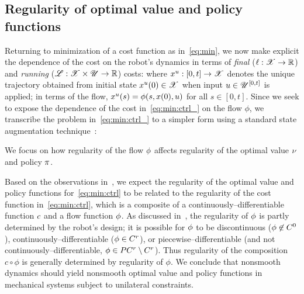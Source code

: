 \documentclass{article}
\begin{document}
\subsection{Regularity of optimal value and policy functions}
\label{sec:reg:opt}
Returning to minimization of a cost function as in~\eqref{eq:min}, 
we now make explicit the dependence of the cost
on the robot's dynamics in terms of 
\emph{final} 
($\ell:\mathscr{X}\rightarrow\mathbb{R}$)
and 
\emph{running}
($\mathscr{L}:\mathscr{X}\times\mathscr{U}\rightarrow\mathbb{R}$)
costs:
where $x^u:[0,t]\rightarrow\mathscr{X}$ denotes the unique trajectory obtained from initial state $x^u(0)\in\mathscr{X}$ when input $u\in\mathscr{U}^{[0,t]}$ is applied; in terms of the flow, $x^u(s) = \phi(s,x(0),u)$ for all $s\in[0,t]$.
Since we seek to expose the dependence of the cost in~\eqref{eq:min:ctrl_} on the flow $\phi$, we transcribe the problem in~\eqref{eq:min:ctrl_} to a simpler form using a standard state augmentation technique~:
 
We focus on how regularity of the flow 
$\phi$ 
affects regularity of the optimal value $\nu$ and policy $\pi$.

Based on the observations in~, we expect the regularity of the optimal value and policy functions for~\eqref{eq:min:ctrl} to be related to the regularity of the cost function in~\eqref{eq:min:ctrl}, which is a composite of a continuously--differentiable function $c$ and a flow function ${\phi}$.
As discussed in~, the regularity of ${\phi}$ is partly determined by the robot's design; 
it is possible for ${\phi}$ to be 
discontinuous (${\phi}\not\in C^0$), 
continuously--differentiable (${\phi}\in C^r$), or 
piecewise--differentiable (and not continuously--differentiable, ${\phi}\in PC^r\setminus C^r$).
Thus regularity of the composition $c\circ{\phi}$ is generally determined by regularity of ${\phi}$.
We conclude that nonsmooth dynamics should yield nonsmooth optimal value and policy functions in mechanical systems subject to unilateral constraints.
\end{document}
